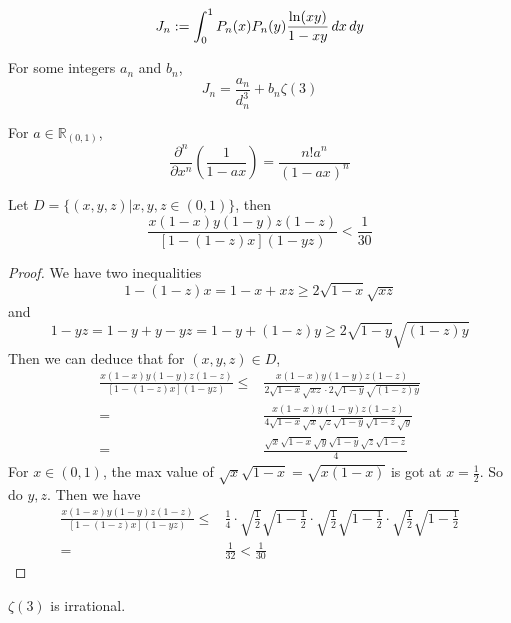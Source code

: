 \begin{definition}\label{J_n}
    \[ J_n := \int_{0}^{1} P_n(x)P_n(y)\frac{{\rm ln}(xy)}{1-xy} \, dx \, dy \]
\end{definition}

\begin{lemma}\label{J_n_integers_an_bn}
    For some integers $a_n$ and $b_n$,
    \[ J_n = \frac{a_n}{d_n^3} + b_n\zeta(3) \]
\end{lemma}

\begin{lemma}\label{frac_partial_n}
    For $a \in \mathbb{R}_{(0,1)}$,
    \[ \frac{\partial^n}{\partial x^n}(\frac{1}{1-ax}) = \frac{n!a^n}{(1-ax)^n} \]
\end{lemma}

\begin{lemma}\label{bound}
    Let $D = \{(x,y,z)|x,y,z\in (0,1)\}$, then
    \[ \frac{x(1-x)y(1-y)z(1-z)}{[1-(1-z)x](1-yz)} < \frac{1}{30} \]
\end{lemma}
\begin{proof}
    We have two inequalities
    \[ 1-(1-z)x = 1-x+xz \geqslant 2\sqrt{1-x}\sqrt{xz} \]
    and
    \[ 1-yz= 1-y+y-yz = 1-y+(1-z)y \geqslant 2\sqrt{1-y}\sqrt{(1-z)y} \]
    Then we can deduce that for $(x,y,z) \in D$,
    \begin{align*}
        \frac{x(1-x)y(1-y)z(1-z)}{[1-(1-z)x](1-yz)} \leqslant& \frac{x(1-x)y(1-y)z(1-z)}{2\sqrt{1-x}\sqrt{xz}\cdot2\sqrt{1-y}\sqrt{(1-z)y}}\\
        =&\frac{x(1-x)y(1-y)z(1-z)}{4\sqrt{1-x}\sqrt{x}\sqrt{z}\sqrt{1-y}\sqrt{1-z}\sqrt{y}}\\
        =&\frac{\sqrt{x}\sqrt{1-x}\sqrt{y}\sqrt{1-y}\sqrt{z}\sqrt{1-z}}{4}
    \end{align*}
    For $x\in (0,1)$, the max value of $\sqrt{x}\sqrt{1-x} = \sqrt{x(1-x)}$ is got at $x=\frac{1}{2}$. So do $y, z$.
    Then we have
    \begin{align*}
        \frac{x(1-x)y(1-y)z(1-z)}{[1-(1-z)x](1-yz)} \leqslant& \frac{1}{4}\cdot\sqrt{\frac{1}{2}}\sqrt{1-\frac{1}{2}}\cdot\sqrt{\frac{1}{2}}\sqrt{1-\frac{1}{2}}\cdot\sqrt{\frac{1}{2}}\sqrt{1-\frac{1}{2}} \\
        =& \frac{1}{32} < \frac{1}{30} 
    \end{align*}
\end{proof}

\begin{theorem}\label{zeta_3_irrational}
    $\zeta(3)$ is irrational.
\end{theorem}
